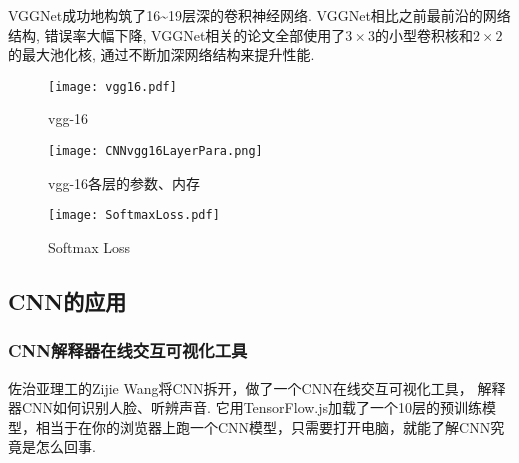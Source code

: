 VGGNet成功地构筑了16\textasciitilde 19层深的卷积神经网络. VGGNet相比之前最前沿的网络结构, 错误率大幅下降,
VGGNet相关的论文全部使用了$3\times 3$的小型卷积核和$2\times 2$的最大池化核, 通过不断加深网络结构来提升性能.
\begin{figure}[H]
    \centering
    \texttt{[image: vgg16.pdf]}
    \caption{vgg-16}
    \label{CNNvgg16020301}\vspace{-0.4cm}
\end{figure}
\begin{figure}[H]
    \centering
    \texttt{[image: CNNvgg16LayerPara.png]}
    \caption{vgg-16各层的参数、内存}
    \label{CNNvgg16LayerPara020302}
    \vspace{-0.4cm}
\end{figure}
\begin{figure}[H]
    \centering
    \texttt{[image: SoftmaxLoss.pdf]}
    \caption{Softmax Loss}
    \label{CNNSoftmaxLoss0203}
    \vspace{-0.4cm}
\end{figure}
\subsection{CNN的应用}
\subsubsection{CNN解释器在线交互可视化工具}
佐治亚理工的Zijie Wang将CNN拆开，做了一个CNN在线交互可视化工具， 解释器CNN如何识别人脸、听辨声音.
它用TensorFlow.js加载了一个10层的预训练模型，相当于在你的浏览器上跑一个CNN模型，只需要打开电脑，就能了解CNN究竟是怎么回事. 

